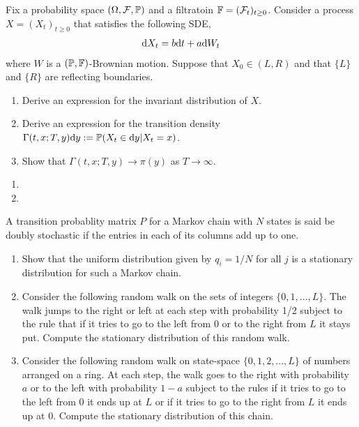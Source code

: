 \begin{problem}
Fix a probability space \( (\Omega, \mathcal{F},\mathbb{P}) \) and a filtratoin \( \mathbb{F} = (\mathcal{F}_t)_{t\geq 0} \). Consider a process \( X = (X_t)_{t\geq 0} \) that satisfies the following SDE,
\begin{align*}
    \mathrm{d} X_t = b\mathrm{d} t + a\mathrm{d} W_t
\end{align*}
where \( W \) is a \( (\mathbb{P},\mathbb{F}) \)-Brownian motion. Suppose that \( X_0 \in (L,R) \) and that \( \{L\} \) and \( \{R\} \) are reflecting boundaries.
\begin{enumerate}[nolistsep,label=(\alph*)]
    \item Derive an expression for the invariant distribution of \( X \).
    \item Derive an expression for the transition density \( \Gamma(t,x;T,y)\mathrm{d} y:= \mathbb{P}(X_t \in\mathrm{d} y | X_t = x) \).
    \item Show that \( \Gamma(t,x;T,y) \to \pi(y) \) as \( T\to\infty \).
\end{enumerate}

\end{problem}

\begin{solution}[Solution]
\begin{enumerate}[label=(\alph*)]
    \item 
    \item 
\end{enumerate}
\end{solution}

\begin{problem}
    A transition probablity matrix \( P \) for a Markov chain with \( N \) states is said be doubly stochastic if the entries in each of its columns add up to one.
\begin{enumerate}[nolistsep,label=(\alph*)]
\item Show that the uniform distribution given by \( q_i = 1/N \) for all \( j \) is a stationary distribution for such a Markov chain.
\item Consider the following random walk on the sets of integers \( \{0, 1, \ldots, L\} \). The walk jumps to the right or left at each step with probability 1/2 subject to the rule that if it tries to go to the left from 0 or to the right from \( L \) it stays put. Compute the stationary distribution of this random walk.
\item Consider the following random walk on state-space \( \{0, 1, 2, \ldots, L\} \) of numbers arranged on a ring. At each step, the walk goes to the right with probability \( a \) or to the left with probability \( 1 - a \) subject to the rules if it tries to go to the left from 0 it ends up at \( L \) or if it tries to go to the right from \( L \) it ends up at 0. Compute the stationary distribution of this chain.
\end{enumerate}
\end{problem}

